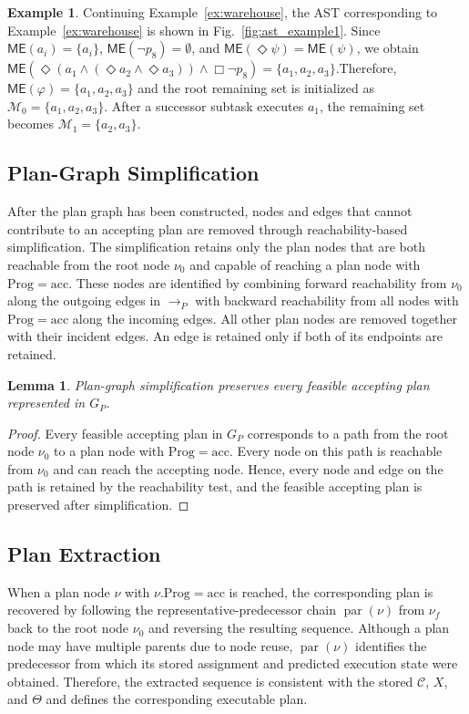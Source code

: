 \documentclass[lettersize,journal]{IEEEtran}
\theoremstyle{italiclemma}
\newtheorem{lemma}{Lemma}
\theoremstyle{italiclemma}
\theoremstyle{definition}
\newtheorem{example}{Example}
\begin{document}
\begin{example}\label{ex:me}
Continuing Example~\ref{ex:warehouse}, the AST corresponding to Example~\ref{ex:warehouse} is shown in Fig.~\ref{fig:ast_example1}. Since
$\mathsf{ME}(a_i)=\{a_i\}$,
$\mathsf{ME}(\neg p_8)=\emptyset$, and
$\mathsf{ME}(\Diamond\psi)=\mathsf{ME}(\psi)$, we obtain
$\mathsf{ME}(\Diamond(a_1\wedge
(\Diamond a_2\wedge\Diamond a_3))\wedge\Box\neg p_8)
=\{a_1,a_2,a_3\}$.Therefore,
$\mathsf{ME}(\varphi)=\{a_1,a_2,a_3\}$ and the root remaining set is initialized as $\mathcal M_0=\{a_1,a_2,a_3\}$. After a successor subtask executes $a_1$, the remaining set becomes $\mathcal M_1=\{a_2,a_3\}$.
\end{example}



\subsection{Plan-Graph Simplification}
\label{subsec:final_pruning}

After the plan graph has been constructed, nodes and edges that cannot contribute to an accepting plan are removed through reachability-based simplification.
The simplification retains only the plan nodes that are both reachable from the root node \(\nu_0\) and capable of reaching a plan node with \(\mathrm{Prog}=\mathrm{acc}\). These nodes are identified by combining forward reachability from \(\nu_0\) along the outgoing edges in \(\rightarrow_P\) with backward reachability from all nodes with \(\mathrm{Prog}=\mathrm{acc}\) along the incoming edges. All other plan nodes are removed together with their incident edges. An edge is retained only if both of its endpoints are retained.

\begin{lemma}\label{lem:plan-graph-simplification}
Plan-graph simplification preserves every feasible accepting plan represented in \(G_P\).
\end{lemma}
\begin{proof}
Every feasible accepting plan in \(G_P\) corresponds to a path from the root node \(\nu_0\) to a plan node with
\(\mathrm{Prog}=\mathrm{acc}\). Every node on this path is reachable from \(\nu_0\) and can reach the accepting node. Hence, every node and edge on the path is retained by the reachability test, and the feasible accepting plan is preserved after simplification.
\end{proof}
\subsection{Plan Extraction}
\label{subsubsec:plan_extraction}
When a plan node $\nu$ with $\nu.\mathrm{Prog}=\mathrm{acc}$ is reached, the corresponding plan is recovered by following the representative-predecessor chain $\operatorname{par}(\nu)$ from $\nu_f$ back to the root node $\nu_0$ and reversing the resulting sequence. Although a plan node may have multiple parents due to node
reuse, $\operatorname{par}(\nu)$ identifies the predecessor from which its stored assignment and predicted execution state were obtained. Therefore, the extracted sequence is consistent with the stored $\mathcal C$, $X$, and $\Theta$ and defines the corresponding executable plan.
\end{document}
